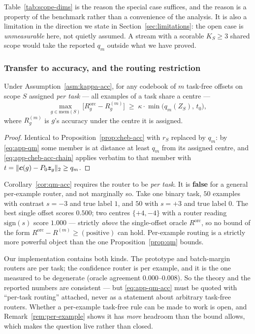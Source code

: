 Table~\ref{tab:scope-dims} is the reason the special case suffices, and the reason is
a property of the benchmark rather than a convenience of the analysis. It is also a
limitation in the direction we state in Section~\ref{sec:limitations}: the open case
is \emph{unmeasurable} here, not quietly assumed. A stream with a scorable $K_S\ge3$
shared scope would take the reported $q_m$ outside what we have proved.

\subsubsection{Transfer to accuracy, and the routing restriction}

\begin{corollary}
\label{cor:qm-acc}
Under Assumption~\ref{asm:kappa-acc}, for any codebook of $m$ task-free offsets on
scope $S$ assigned \emph{per task} --- all examples of a task share a centre ---
\begin{equation}
  \max_{g\in\mathrm{mem}(S)}\big[R_g^{\mathrm{orc}}-R_g^{(m)}\big]
  \;\ge\;\kappa\cdot\min\big(q_m(Z_S),\,t_0\big),
  \label{eq:app-qm-acc}
\end{equation}
where $R_g^{(m)}$ is $g$'s accuracy under the centre it is assigned.
\end{corollary}

\begin{proof}
Identical to Proposition~\ref{prop:cheb-acc} with $r_S$ replaced by $q_m$: by
\eqref{eq:app-qm} some member is at distance at least $q_m$ from its assigned
centre, and \eqref{eq:app-cheb-acc-chain} applies verbatim to that member with
$t=\|\bm{c}(g)-P_0\bm{z}_g\|_2\ge q_m$.
\end{proof}

\begin{remark}
\label{rem:per-example}
Corollary~\ref{cor:qm-acc} requires the router to be \emph{per task}. It is
\textbf{false} for a general per-example router, and not marginally so. Take one
binary task, $50$ examples with contrast $s=-3$ and true label $1$, and $50$ with
$s=+3$ and true label $0$. The best single offset scores $0.500$; two centres
$\{+4,-4\}$ with a router reading $\mathrm{sign}(s)$ score $1.000$ --- strictly
\emph{above} the single-offset oracle $R^{\mathrm{orc}}$, so no bound of the form
$R^{\mathrm{orc}}-R^{(m)}\ge(\text{positive})$ can hold. Per-example routing is a
strictly more powerful object than the one Proposition~\ref{prop:qm} bounds.

Our implementation contains both kinds. The prototype and batch-margin routers are
per task; the confidence router is per example, and it is the one measured to be
degenerate (oracle agreement $0.000$--$0.008$). So the theory and the reported
numbers are consistent --- but \eqref{eq:app-qm-acc} must be quoted with
``per-task routing'' attached, never as a statement about arbitrary task-free
routers. Whether a per-example task-free rule can be made to work is open, and
Remark~\ref{rem:per-example} shows it has \emph{more} headroom than the bound
allows, which makes the question live rather than closed.
\end{remark}

